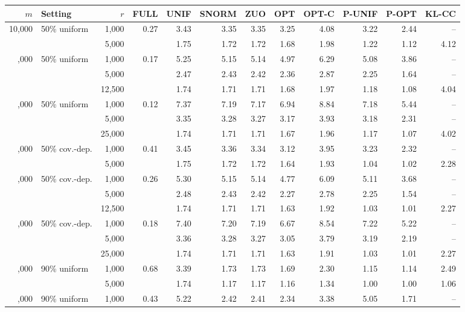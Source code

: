 \begin{tabular}{rlrrrrrrrrrr}
\toprule
\(m\) & Setting & \(r\) & FULL & UNIF & SNORM & ZUO & OPT & OPT-C & P-UNIF & P-OPT & KL-CC\\
\midrule
10,000 & 50\% uniform & 1,000 & 0.27 & 3.43 & 3.35 & 3.35 & 3.25 & 4.08 & 3.22 & 2.44 & --\\
 &  & 5,000 &  & 1.75 & 1.72 & 1.72 & 1.68 & 1.98 & 1.22 & 1.12 & 4.12\\
\addlinespace
25,000 & 50\% uniform & 1,000 & 0.17 & 5.25 & 5.15 & 5.14 & 4.97 & 6.29 & 5.08 & 3.86 & --\\
 &  & 5,000 &  & 2.47 & 2.43 & 2.42 & 2.36 & 2.87 & 2.25 & 1.64 & --\\
 &  & 12,500 &  & 1.74 & 1.71 & 1.71 & 1.68 & 1.97 & 1.18 & 1.08 & 4.04\\
\addlinespace
50,000 & 50\% uniform & 1,000 & 0.12 & 7.37 & 7.19 & 7.17 & 6.94 & 8.84 & 7.18 & 5.44 & --\\
 &  & 5,000 &  & 3.35 & 3.28 & 3.27 & 3.17 & 3.93 & 3.18 & 2.31 & --\\
 &  & 25,000 &  & 1.74 & 1.71 & 1.71 & 1.67 & 1.96 & 1.17 & 1.07 & 4.02\\
\addlinespace
10,000 & 50\% cov.-dep. & 1,000 & 0.41 & 3.45 & 3.36 & 3.34 & 3.12 & 3.95 & 3.23 & 2.32 & --\\
 &  & 5,000 &  & 1.75 & 1.72 & 1.72 & 1.64 & 1.93 & 1.04 & 1.02 & 2.28\\
\addlinespace
25,000 & 50\% cov.-dep. & 1,000 & 0.26 & 5.30 & 5.15 & 5.14 & 4.77 & 6.09 & 5.11 & 3.68 & --\\
 &  & 5,000 &  & 2.48 & 2.43 & 2.42 & 2.27 & 2.78 & 2.25 & 1.54 & --\\
 &  & 12,500 &  & 1.74 & 1.71 & 1.71 & 1.63 & 1.92 & 1.03 & 1.01 & 2.27\\
\addlinespace
50,000 & 50\% cov.-dep. & 1,000 & 0.18 & 7.40 & 7.20 & 7.19 & 6.67 & 8.54 & 7.22 & 5.22 & --\\
 &  & 5,000 &  & 3.36 & 3.28 & 3.27 & 3.05 & 3.79 & 3.19 & 2.19 & --\\
 &  & 25,000 &  & 1.74 & 1.71 & 1.71 & 1.63 & 1.91 & 1.03 & 1.01 & 2.27\\
\addlinespace
10,000 & 90\% uniform & 1,000 & 0.68 & 3.39 & 1.73 & 1.73 & 1.69 & 2.30 & 1.15 & 1.14 & 2.49\\
 &  & 5,000 &  & 1.74 & 1.17 & 1.17 & 1.16 & 1.34 & 1.00 & 1.00 & 1.06\\
\addlinespace
25,000 & 90\% uniform & 1,000 & 0.43 & 5.22 & 2.42 & 2.41 & 2.34 & 3.38 & 5.05 & 1.71 & --\\

\end{tabular}
